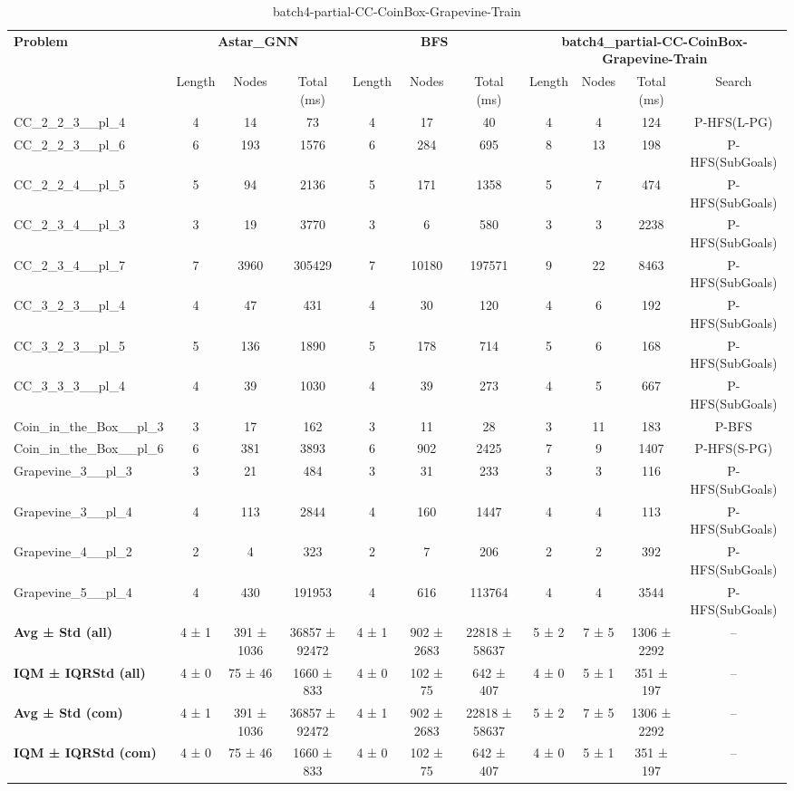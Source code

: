 \begin{table}[!ht]
\centering
\scriptsize
\begin{tabular}{l|ccc|ccc|cccc}
\multirow{2}{*}{\textbf{Problem}} & \multicolumn{3}{c|}{\textbf{Astar\_GNN}} & \multicolumn{3}{c|}{\textbf{BFS}} & \multicolumn{4}{c}{\textbf{batch4\_partial-CC-CoinBox-Grapevine-Train}} \\
\cline{2-11}
& Length & Nodes & Total (ms) & Length & Nodes & Total (ms) & Length & Nodes & Total (ms) & Search \\
\hline
CC\_2\_2\_3\_\_pl\_4 & 4 & 14 & 73 & 4 & 17 & 40 & 4 & 4 & 124 & P-HFS(L-PG) \\
CC\_2\_2\_3\_\_pl\_6 & 6 & 193 & 1576 & 6 & 284 & 695 & 8 & 13 & 198 & P-HFS(SubGoals) \\
CC\_2\_2\_4\_\_pl\_5 & 5 & 94 & 2136 & 5 & 171 & 1358 & 5 & 7 & 474 & P-HFS(SubGoals) \\
CC\_2\_3\_4\_\_pl\_3 & 3 & 19 & 3770 & 3 & 6 & 580 & 3 & 3 & 2238 & P-HFS(SubGoals) \\
CC\_2\_3\_4\_\_pl\_7 & 7 & 3960 & 305429 & 7 & 10180 & 197571 & 9 & 22 & 8463 & P-HFS(SubGoals) \\
CC\_3\_2\_3\_\_pl\_4 & 4 & 47 & 431 & 4 & 30 & 120 & 4 & 6 & 192 & P-HFS(SubGoals) \\
CC\_3\_2\_3\_\_pl\_5 & 5 & 136 & 1890 & 5 & 178 & 714 & 5 & 6 & 168 & P-HFS(SubGoals) \\
CC\_3\_3\_3\_\_pl\_4 & 4 & 39 & 1030 & 4 & 39 & 273 & 4 & 5 & 667 & P-HFS(SubGoals) \\
Coin\_in\_the\_Box\_\_pl\_3 & 3 & 17 & 162 & 3 & 11 & 28 & 3 & 11 & 183 & P-BFS \\
Coin\_in\_the\_Box\_\_pl\_6 & 6 & 381 & 3893 & 6 & 902 & 2425 & 7 & 9 & 1407 & P-HFS(S-PG) \\
Grapevine\_3\_\_pl\_3 & 3 & 21 & 484 & 3 & 31 & 233 & 3 & 3 & 116 & P-HFS(SubGoals) \\
Grapevine\_3\_\_pl\_4 & 4 & 113 & 2844 & 4 & 160 & 1447 & 4 & 4 & 113 & P-HFS(SubGoals) \\
Grapevine\_4\_\_pl\_2 & 2 & 4 & 323 & 2 & 7 & 206 & 2 & 2 & 392 & P-HFS(SubGoals) \\
Grapevine\_5\_\_pl\_4 & 4 & 430 & 191953 & 4 & 616 & 113764 & 4 & 4 & 3544 & P-HFS(SubGoals) \\
\hline
\textbf{Avg ± Std (all)} & 4 ± 1 & 391 ± 1036 & 36857 ± 92472 & 4 ± 1 & 902 ± 2683 & 22818 ± 58637 & 5 ± 2 & 7 ± 5 & 1306 ± 2292 & -- \\
\textbf{IQM ± IQRStd (all)} & 4 ± 0 & 75 ± 46 & 1660 ± 833 & 4 ± 0 & 102 ± 75 & 642 ± 407 & 4 ± 0 & 5 ± 1 & 351 ± 197 & -- \\
\textbf{Avg ± Std (com)} & 4 ± 1 & 391 ± 1036 & 36857 ± 92472 & 4 ± 1 & 902 ± 2683 & 22818 ± 58637 & 5 ± 2 & 7 ± 5 & 1306 ± 2292 & -- \\
\textbf{IQM ± IQRStd (com)} & 4 ± 0 & 75 ± 46 & 1660 ± 833 & 4 ± 0 & 102 ± 75 & 642 ± 407 & 4 ± 0 & 5 ± 1 & 351 ± 197 & -- \\
\end{tabular}
\caption{batch4-partial-CC-CoinBox-Grapevine-Train}
\label{tab:batch4_partial_CC-CoinBox-Grapevine_comparison_train}
\end{table}
